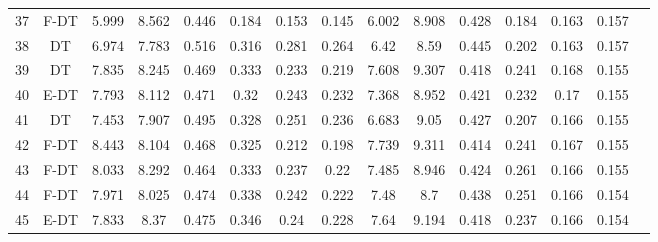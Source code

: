 \begin{longtable}{@{\hskip3pt}c@{\hskip3pt}c@{\hskip3pt}c@{\hskip3pt}c@{\hskip3pt}c@{\hskip3pt}c@{\hskip3pt}c@{\hskip3pt}c@{\hskip3pt}c@{\hskip3pt}c@{\hskip3pt}c@{\hskip3pt}c@{\hskip3pt}c@{\hskip3pt}c@{\hskip3pt}c}
         37 &           F-DT &             5.999 &          8.562 &           0.446 &           0.184 &           0.153 &           0.145 &               6.002 &           8.908 &           0.428 &         0.184 &          0.163 &           0.157 \\
         38 &             DT &             6.974 &          7.783 &           0.516 &           0.316 &           0.281 &           0.264 &                6.42 &            8.59 &           0.445 &         0.202 &          0.163 &           0.157 \\
         39 &             DT &             7.835 &          8.245 &           0.469 &           0.333 &           0.233 &           0.219 &               7.608 &           9.307 &           0.418 &         0.241 &          0.168 &           0.155 \\
         40 &           E-DT &             7.793 &          8.112 &           0.471 &            0.32 &           0.243 &           0.232 &               7.368 &           8.952 &           0.421 &         0.232 &           0.17 &           0.155 \\
         41 &             DT &             7.453 &          7.907 &           0.495 &           0.328 &           0.251 &           0.236 &               6.683 &            9.05 &           0.427 &         0.207 &          0.166 &           0.155 \\
         42 &           F-DT &             8.443 &          8.104 &           0.468 &           0.325 &           0.212 &           0.198 &               7.739 &           9.311 &           0.414 &         0.241 &          0.167 &           0.155 \\
         43 &           F-DT &             8.033 &          8.292 &           0.464 &           0.333 &           0.237 &            0.22 &               7.485 &           8.946 &           0.424 &         0.261 &          0.166 &           0.155 \\
         44 &           F-DT &             7.971 &          8.025 &           0.474 &           0.338 &           0.242 &           0.222 &                7.48 &             8.7 &           0.438 &         0.251 &          0.166 &           0.154 \\
         45 &           E-DT &             7.833 &           8.37 &           0.475 &           0.346 &            0.24 &           0.228 &                7.64 &           9.194 &           0.418 &         0.237 &          0.166 &           0.154 \\

\end{longtable}
